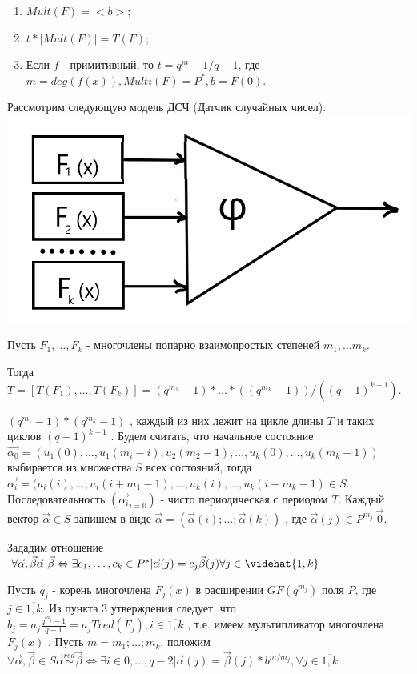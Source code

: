 \begin{enumerate}
\item $Mult(F) = <b>$;
\item $t * |Mult(F)|=T(F)$;
\item  Если $f$ - примитивный, то $t= {q^m - 1}/{q-1}$, где $m=deg(f(x)), Multi(F)=P^*, b=F(0)$.
\end{enumerate}

Рассмотрим следующую модель ДСЧ (Датчик случайных чисел).\\

\includegraphics[scale=0.35]{DSC}

Пусть $F_1, \dots, F_k$ - многочлены попарно взаимопростых степеней $m_1, \dots m_k$.

Тогда $T=[T(F_1), \dots, T(F_k)] = (q^{m_1} - 1) * \dots * ((q^{m_k} - 1))/((q-1)^{k-1})$.

$(q^{m_1} - 1) * (q^{m_k} - 1)$ , каждый из них лежит на цикле длины $T$ и таких циклов $(q-1)^{k-1}$ . Будем считать, что начальное состояние $\vec{\alpha_0} = (u_1(0), \dots, u_1(m_i - i), u_2(m_2-1), \dots, u_k(0), \dots, u_k(m_k-1))$ выбирается из множества $S$ всех состояний, тогда $\vec{\alpha_i}=(u_i(i), \dots, u_i(i+m_1-1), \dots, u_k(i), \dots, u_k(i+m_k-1) \in S$.
 Последовательность $(\vec{\alpha_i}_{i=0})$ - чисто периодическая с периодом $T$.
Каждый вектор $\vec{\alpha} \in S$ запишем в виде $\vec{\alpha} = (\vec{\alpha}(i); \dots; \vec{\alpha}(k))$ , где $\vec{\alpha}(j) \in P^{m_j} \ {\vec{0}}$.

Зададим отношение ~ $|\forall \vec{\alpha}, \vec{\beta} \vec{\alpha}~\vec{\beta} \Leftrightarrow \exists c_1, \dots, c_k \in P^*|\vec{\alpha}(j) = c_j \vec{\beta}(j) \forall j \in \videhat{1,k}$

Пусть $q_j$ - корень многочлена $F_j(x)$ в расширении $GF(q^{m_j})$ поля $P$, где $j \in \overline{1,k}$. Из пункта 3 утверждения следует, что $b_j = a_j \frac{q^{m_j}-1}{q-1} = a_j Tred(F_j), i \in \overline{1,k}$ , т.е. имеем мультипликатор многочлена $F_j(x)$ . Пусть $m=m_1; \dots; m_k$, положим $\forall \vec{\alpha}, \vec{\beta} \in S  \vec{\alpha} \stackrel{red}{\sim} \vec{\beta} \Leftrightarrow \exists i \in {0, \dots, q-2} | \vec{\alpha}(j) = \vec{\beta}(j) * b^{m/m_j}, \forall j \in \overline{1,k}$ .

